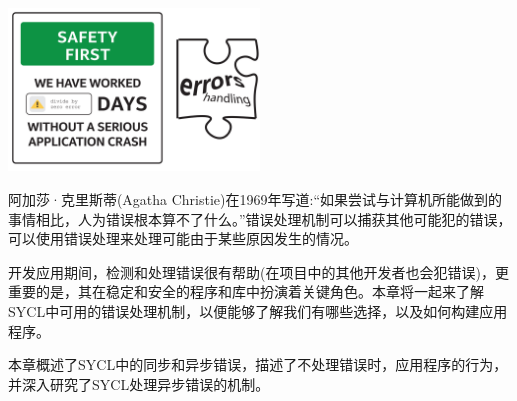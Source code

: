 \begin{center}
	\includegraphics[width=0.5\textwidth]{content/chapter-5/images/1}
\end{center}

阿加莎·克里斯蒂(Agatha Christie)在1969年写道:“如果尝试与计算机所能做到的事情相比，人为错误根本算不了什么。”错误处理机制可以捕获其他可能犯的错误，可以使用错误处理来处理可能由于某些原因发生的情况。\par

开发应用期间，检测和处理错误很有帮助(在项目中的其他开发者也会犯错误)，更重要的是，其在稳定和安全的程序和库中扮演着关键角色。本章将一起来了解SYCL中可用的错误处理机制，以便能够了解我们有哪些选择，以及如何构建应用程序。\par

本章概述了SYCL中的同步和异步错误，描述了不处理错误时，应用程序的行为，并深入研究了SYCL处理异步错误的机制。\par